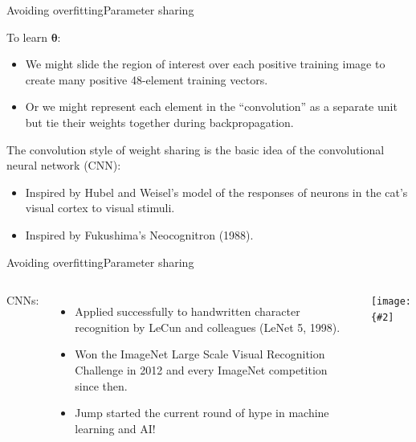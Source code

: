 \documentclass{beamer}
\renewcommand{\vec}[1]{\boldsymbol{#1}}
\newcommand{\myfig}[3]{\centerline{\texttt{[image: \{\#2]}}}
\begin{document}
\begin{frame}{Avoiding overfitting}{Parameter sharing}

  To learn $\vec{\theta}$:
  \begin{itemize}
    \item We might \alert{slide} the region of interest over each
      positive training image to create many positive 48-element
      training vectors.
    \item Or we might represent each element in the ``convolution'' as
      a separate unit but \alert{tie} their weights together during
      backpropagation.
  \end{itemize}

  \medskip
  
  The convolution style of weight sharing is the basic idea of the
  \alert{convolutional neural network} (CNN):
  \begin{itemize}
  \item Inspired by Hubel and Weisel's model of the responses of
    neurons in the cat's visual cortex to visual stimuli.
  \item Inspired by Fukushima's Neocognitron (1988).
  \end{itemize}
  
\end{frame}


\begin{frame}{Avoiding overfitting}{Parameter sharing}

  \begin{columns}

    \column{2in}
    
    CNNs:
    \begin{itemize}
    \item Applied successfully to handwritten character recognition by
      LeCun and colleagues (LeNet 5, 1998).
    \item Won the ImageNet Large Scale Visual Recognition Challenge in 2012 and
      every ImageNet competition since then.
    \item Jump started the current round of hype in machine learning and AI!
    \end{itemize}

    \medskip

    \column{2.5in}
    
    \myfig{2.5in}{gartner-2017}{Gartner hype cycle (2017)}

  \end{columns}
  
\end{frame}
\end{document}

